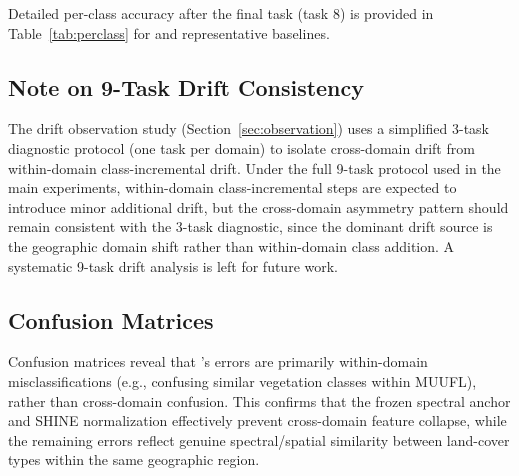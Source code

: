 Detailed per-class accuracy after the final task (task 8) is provided in Table~\ref{tab:perclass} for \methodname{} and representative baselines.





\subsection{Note on 9-Task Drift Consistency}
\label{app:9task_drift}

The drift observation study (Section~\ref{sec:observation}) uses a simplified 3-task diagnostic protocol (one task per domain) to isolate cross-domain drift from within-domain class-incremental drift.
Under the full 9-task protocol used in the main experiments, within-domain class-incremental steps are expected to introduce minor additional drift, but the cross-domain asymmetry pattern should remain consistent with the 3-task diagnostic, since the dominant drift source is the geographic domain shift rather than within-domain class addition.
A systematic 9-task drift analysis is left for future work.

\subsection{Confusion Matrices}
\label{app:confusion}

Confusion matrices reveal that \methodname{}'s errors are primarily within-domain misclassifications (e.g., confusing similar vegetation classes within MUUFL), rather than cross-domain confusion.
This confirms that the frozen spectral anchor and SHINE normalization effectively prevent cross-domain feature collapse, while the remaining errors reflect genuine spectral/spatial similarity between land-cover types within the same geographic region.
